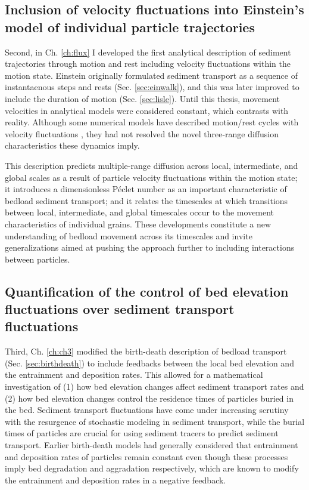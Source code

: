 \subsection{Inclusion of velocity fluctuations into Einstein's model of individual particle trajectories}

Second, in Ch. \ref{ch:flux} I developed the first analytical description of sediment trajectories through motion and rest including velocity fluctuations within the motion state.
Einstein originally formulated sediment transport as a sequence of instantaenous steps and rests (Sec. \ref{sec:einwalk}), and this was later improved to include the duration of motion (Sec. \ref{sec:lisle}).
Until this thesis, movement velocities in analytical models were considered constant, which contrasts with reality. 
Although some numerical models have described motion/rest cycles with velocity fluctuations \citep{Fan2016,Bialik2012,Schmeeckle2014}, they had not resolved the novel three-range diffusion characteristics these dynamics imply.

This description predicts multiple-range diffusion across local, intermediate, and global scales as a result of particle velocity fluctuations within the motion state; it introduces a dimensionless P\'{e}clet number as an important characteristic of bedload sediment transport; and it relates the timescales at which transitions between local, intermediate, and global timescales occur to the movement characteristics of individual grains.
These developments constitute a new understanding of bedload movement across its timescales and invite generalizations aimed at pushing the approach further to including interactions between particles.

\subsection{Quantification of the control of bed elevation fluctuations over sediment transport fluctuations}

Third, Ch. \ref{ch:ch3} modified the birth-death description of bedload transport (Sec. \ref{sec:birthdeath}) to include feedbacks between the local bed elevation and the entrainment and deposition rates.
This allowed for a mathematical investigation of (1) how bed elevation changes affect sediment transport rates and (2) how bed elevation changes control the residence times of particles buried in the bed.
Sediment transport fluctuations have come under increasing scrutiny with the resurgence of stochastic modeling in sediment transport, while the burial times of particles are crucial for using sediment tracers to predict sediment transport.
Earlier birth-death models had generally considered that entrainment and deposition rates of particles remain constant even though these processes imply bed degradation and aggradation respectively, which are known to modify the entrainment and deposition rates in a negative feedback.

